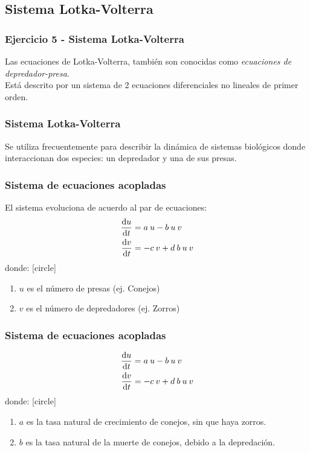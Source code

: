 \subsection{Sistema Lotka-Volterra}
\begin{frame}
\frametitle{Ejercicio 5 - Sistema Lotka-Volterra}
Las ecuaciones de Lotka-Volterra, también son conocidas como \emph{ecuaciones de depredador-presa}.
\\
\bigskip
Está descrito por un sistema de 2 ecuaciones diferenciales no lineales de primer orden.
\end{frame}
\begin{frame}
\frametitle{Sistema Lotka-Volterra}
Se utiliza frecuentemente para describir la dinámica de sistemas biológicos donde interaccionan dos especies: un depredador y una de sus presas.
\end{frame}
\begin{frame}
\frametitle{Sistema de ecuaciones acopladas}
El sistema evoluciona de acuerdo al par de ecuaciones:
\begin{align*}
\dv{u}{t} &= a \: u - b \: u \: v \\
\dv{v}{t} &= -c \: v + d \: b\: u\: v
\end{align*}
donde:  
[circle]
\begin{enumerate}[<+->]
\item $u$ es el número de presas (ej. Conejos)
\item $v$ es el número de depredadores (ej. Zorros)
\seti
\end{enumerate}
\end{frame}
\begin{frame}
\frametitle{Sistema de ecuaciones acopladas}
\begin{align*}
\dv{u}{t} &= a \: u - b \: u \: v \\
\dv{v}{t} &= -c \: v + d \: b\: u\: v
\end{align*}
donde:
[circle]
\begin{enumerate}[<+->]
\conti
\item $a$ es la tasa natural de crecimiento de conejos, sin que haya zorros.
\item $b$ es la tasa natural de la muerte de conejos, debido a la depredación.
\seti
\end{enumerate}
\end{frame}
